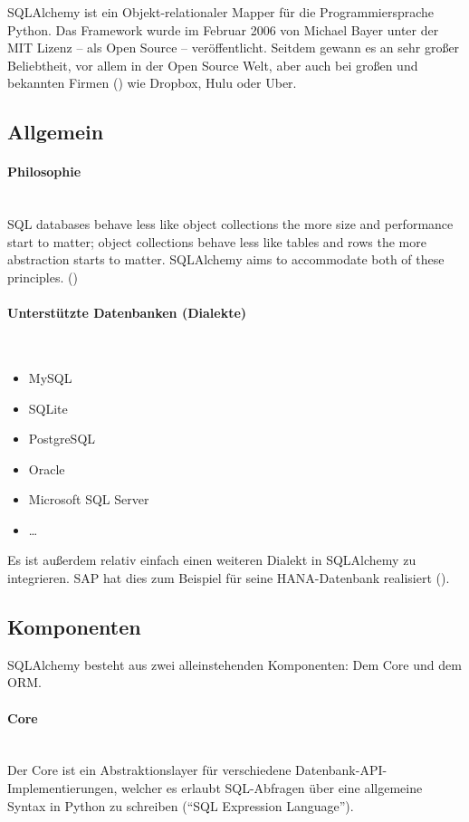 SQLAlchemy ist ein Objekt-relationaler Mapper für die Programmiersprache Python. Das Framework wurde im Februar 2006 von Michael Bayer unter der MIT Lizenz – als Open Source – veröffentlicht. Seitdem gewann es an sehr großer Beliebtheit, vor allem in der Open Source Welt, aber auch bei großen und bekannten Firmen (\cite[Organizations]{SQLA1}) wie Dropbox, Hulu oder Uber.

\subsection{Allgemein}

\paragraph{Philosophie} \hspace{0pt} \\
SQL databases behave less like object collections the more size and performance start to matter; object collections behave less like tables and rows the more abstraction starts to matter. SQLAlchemy aims to accommodate both of these principles. (\cite[Philosophy]{SQLA1})

\paragraph{Unterstützte Datenbanken (Dialekte)} \hspace{0pt} \\
\begin{itemize}
	\item MySQL
	\item SQLite
	\item PostgreSQL
	\item Oracle
	\item Microsoft SQL Server
	\item …
\end{itemize}

Es ist außerdem relativ einfach einen weiteren Dialekt in SQLAlchemy zu integrieren. SAP hat dies zum Beispiel für seine HANA-Datenbank realisiert (\cite[SQLAlchemy-Hana]{GitH1}).

\subsection{Komponenten}
SQLAlchemy besteht aus zwei alleinstehenden Komponenten: Dem Core und dem ORM.

\paragraph{Core} \hspace{0pt} \\
Der Core ist ein Abstraktionslayer für verschiedene Datenbank-API-Implementierungen, welcher es erlaubt SQL-Abfragen über eine allgemeine Syntax in Python zu schreiben ("`SQL Expression Language"').


